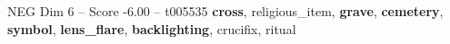 \begin{textsample}{NEG Dim 6 – Score -6.00 – t005535}  \label{ex:f6_neg_035}
\textbf{cross}, religious\_item, \textbf{grave}, \textbf{cemetery}, \textbf{symbol}, \textbf{lens\_flare}, \textbf{backlighting}, crucifix, ritual

\end{textsample}
